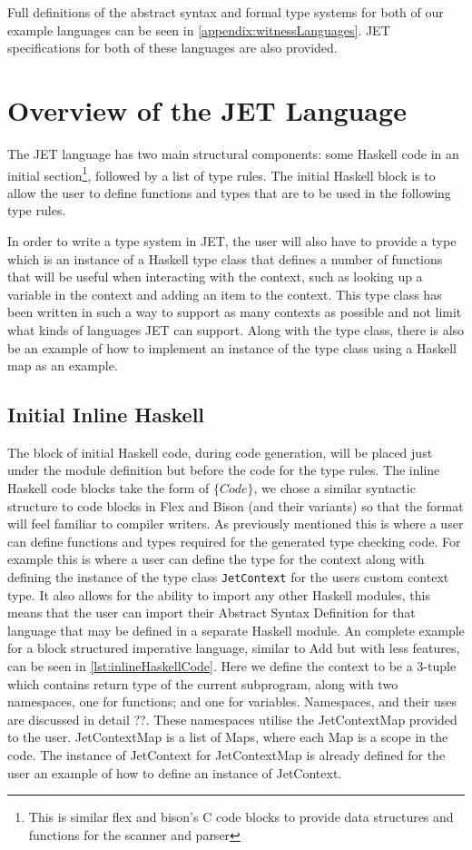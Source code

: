 Full definitions of the abstract syntax and formal type systems for both of our example languages can be seen in \autoref{appendix:witnessLanguages}.
JET specifications for both of these languages are also provided.

\section{Overview of the JET Language}
The JET language has two main structural components: some Haskell code in an initial section\footnote{This is similar flex and bison's C code blocks to provide data structures and functions for the scanner and parser}, followed by a list of type rules.
The initial Haskell block is to allow the user to define functions and types that are to be used in the following type rules.

In order to write a type system in JET, the user will also have to provide a type which is an instance of a Haskell type class that defines a number of functions that will be useful when interacting with the context, such as looking up a variable in the context and adding an item to the context.
This type class has been written in such a way to support as many contexts as possible and not limit what kinds of languages JET can support.
Along with the type class, there is also be an example of how to implement an instance of the type class using a Haskell map as an example.

\subsection{Initial Inline Haskell}
The block of initial Haskell code, during code generation, will be placed just under the module definition but before the code for the type rules.
The inline Haskell code blocks take the form of $\{Code\}$, we chose a similar syntactic structure to code blocks in Flex and Bison (and their variants) so that the format will feel familiar to compiler writers.
As previously mentioned this is where a user can define functions and types required for the generated type checking code.
For example this is where a user can define the type for the context along with defining the instance of the type class \texttt{JetContext} for the users custom context type.
It also allows for the ability to import any other Haskell modules, this means that the user can import their Abstract Syntax Definition for that language that may be defined in a separate Haskell module.
An complete example for a block structured imperative language, similar to Add but with less features, can be seen in \autoref{lst:inlineHaskellCode}.
Here we define the context to be a 3-tuple which contains return type of the current subprogram, along with two namespaces, one for functions; and one for variables.
Namespaces, and their uses are discussed in detail ??.
These namespaces utilise the JetContextMap provided to the user.
JetContextMap is a list of Maps, where each Map is a scope in the code.
The instance of JetContext for JetContextMap is already defined for the user an example of how to define an instance of JetContext.


